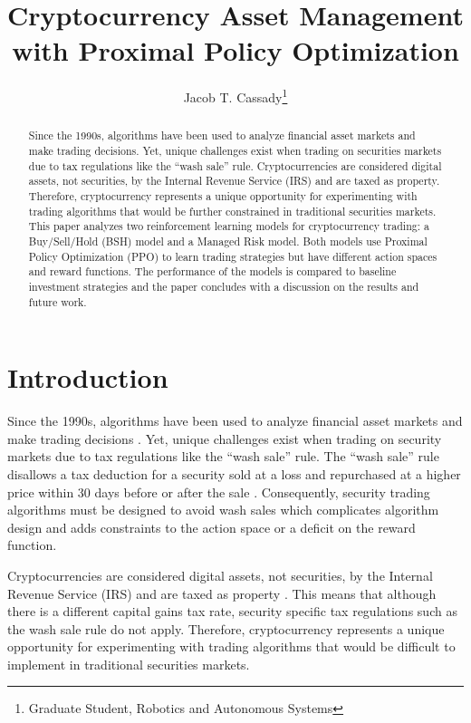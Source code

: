 \documentclass[journal]{new-aiaa}
\title{Cryptocurrency Asset Management with Proximal Policy Optimization}
\author{Jacob T. Cassady\footnote{Graduate Student, Robotics and Autonomous Systems}}
\affil{Johns Hopkins Whiting School of Engineering, Baltimore, Maryland, 21218}
\begin{document}
\maketitle
\begin{abstract}
        Since the 1990s, algorithms have been used to analyze financial asset markets and make trading decisions.
        Yet, unique challenges exist when trading on securities markets due to tax regulations like the ``wash sale'' rule.
        Cryptocurrencies are considered digital assets, not securities, by the Internal Revenue Service (IRS) and are taxed as property.
        Therefore, cryptocurrency represents a unique opportunity for experimenting with trading algorithms that would be further constrained in traditional securities markets.
        This paper analyzes two reinforcement learning models for cryptocurrency trading: a Buy/Sell/Hold (BSH) model and a Managed Risk model.
        Both models use Proximal Policy Optimization (PPO) to learn trading strategies but have different action spaces and reward functions.
        The performance of the models is compared to baseline investment strategies and the paper concludes with a discussion on the results and future work.
\end{abstract}

\section{Introduction}\label{sec:Introduction}
Since the 1990s, algorithms have been used to analyze financial asset markets and make trading decisions \cite{HU2015534}.
Yet, unique challenges exist when trading on security markets due to tax regulations like the ``wash sale'' rule.
The ``wash sale'' rule disallows a tax deduction for a security sold at a loss and repurchased at a higher price within 30 days before or after the sale \cite{wash_sale}.
Consequently, security trading algorithms must be designed to avoid wash sales which complicates algorithm design and adds constraints to the action space or a deficit on the reward function.

Cryptocurrencies are considered digital assets, not securities, by the Internal Revenue Service (IRS) and are taxed as property \cite{crypto_irs}.
This means that although there is a different capital gains tax rate, security specific tax regulations such as the wash sale rule do not apply.
Therefore, cryptocurrency represents a unique opportunity for experimenting with trading algorithms that would be difficult to implement in traditional securities markets.
\end{document}
